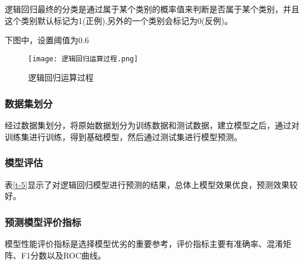 逻辑回归最终的分类是通过属于某个类别的概率值来判断是否属于某个类别，并且这个类别默认标记为1(正例),另外的一个类别会标记为0(反例)。\textsuperscript{\cite{b3}}

下图中，设置阈值为0.6
\begin{figure}[!h]
	\centering
	\texttt{[image: 逻辑回归运算过程.png]}
	\setlength{\abovecaptionskip}{3pt}%
	\caption{逻辑回归运算过程}
	\label{p-14}
\end{figure}

\subsubsection{数据集划分}
经过数据集划分，将原始数据划分为训练数据和测试数据，建立模型之后，通过对训练集进行训练，得到基础模型，然后通过测试集进行模型预测。

\subsubsection{模型评估}
\begin{table}[h]
	\centering
	\setlength{\abovecaptionskip}{3pt}%
	\caption{逻辑回归模型分析}
	\vspace{1pt}
	\label{t-5}
\end{table}

表\ref{t-5}显示了对逻辑回归模型进行预测的结果，总体上模型效果优良，预测效果较好。

\subsubsection{预测模型评价指标}
模型性能评价指标是选择模型优劣的重要参考，评价指标主要有准确率、混淆矩阵、F1分数以及ROC曲线。

